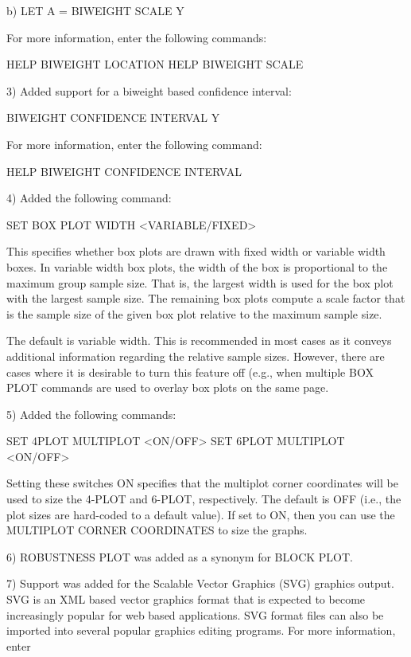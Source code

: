 {    b)  LET A = BIWEIGHT SCALE Y

    For more information, enter the following commands:

        HELP BIWEIGHT LOCATION
        HELP BIWEIGHT SCALE

 3) Added support for a biweight based confidence interval:

       BIWEIGHT CONFIDENCE INTERVAL Y

    For more information, enter the following command:

        HELP BIWEIGHT CONFIDENCE INTERVAL

 4) Added the following command:

       SET BOX PLOT WIDTH  <VARIABLE/FIXED>

    This specifies whether box plots are drawn with fixed width
    or variable width boxes.  In variable width box plots, the
    width of the box is proportional to the maximum group sample
    size.  That is, the largest width is used for the box plot
    with the largest sample size.  The remaining box plots
    compute a scale factor that is the sample size of the given
    box plot relative to the maximum sample size.

    The default is variable width.  This is recommended in most cases
    as it conveys additional information regarding the relative
    sample sizes.  However, there are cases where it is desirable
    to turn this feature off (e.g., when multiple BOX PLOT commands
    are used to overlay box plots on the same page.

 5) Added the following commands:

      SET 4PLOT MULTIPLOT  <ON/OFF>
      SET 6PLOT MULTIPLOT  <ON/OFF>

    Setting these switches ON specifies that the multiplot corner
    coordinates will be used to size the 4-PLOT and 6-PLOT,
    respectively.  The default is OFF (i.e., the plot sizes are
    hard-coded to a default value).  If set to ON, then you
    can use the MULTIPLOT CORNER COORDINATES to size the
    graphs.

 6) ROBUSTNESS PLOT was added as a synonym for BLOCK PLOT.

 7) Support was added for the Scalable Vector Graphics (SVG)
    graphics output.  SVG is an XML based vector graphics format
    that is expected to become increasingly popular for web based
    applications.  SVG format files can also be imported into
    several popular graphics editing programs.  For more information,
    enter

}
